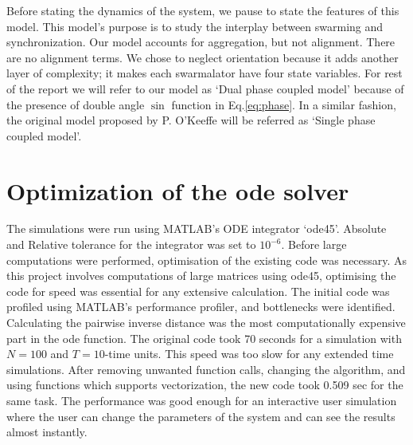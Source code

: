 \documentclass[superscriptaddress,reprint,amssymb, amsmath,aps, pre]{revtex4-1}
\begin{document}
{    Before stating the dynamics of the system, we pause to state the features of this model. This model's purpose is to study the interplay between swarming and synchronization. Our model accounts for aggregation, but not alignment. There are no alignment terms.  We chose to neglect orientation because it adds another layer of complexity; it makes each swarmalator have four state variables. For rest of the report we will refer to our model as `Dual phase coupled model' because of the presence of double angle $\sin$ function in Eq.\ref{eq:phase}. In a similar fashion, the original model proposed by P. O'Keeffe will be referred as `Single phase coupled model'.\noindent
}
\section{Optimization of the ode solver}
{
    The simulations were run using MATLAB's ODE integrator `ode45'. Absolute and Relative tolerance for the integrator was set to $10^{-6}$. Before large computations were performed, optimisation of the existing code was necessary. As this project involves computations of large matrices using ode45, optimising the code for speed was essential for any extensive calculation. The initial code was profiled using MATLAB's performance profiler, and bottlenecks were identified. Calculating the pairwise inverse distance was the most computationally expensive part in the ode function. The original code took 70 seconds for a simulation with $N = 100$ and $T = 10$-time units. This speed was too slow for any extended time simulations. After removing unwanted function calls, changing the algorithm, and using functions which supports vectorization, the new code took 0.509 sec for the same task. The performance was good enough for an interactive user simulation where the user can change the parameters of the system and can see the results almost instantly.
}
\end{document}
